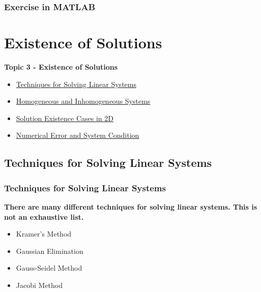 \documentclass[fleqn]{beamer} %
\newcommand{\sectionIIItitle}{Existence of Solutions}
\newcommand{\sectionIIsubsectionIVtitle}{Exercise in MATLAB}
\newcommand{\sectionIIIsubsectionItitle}{Techniques for Solving Linear Systems}
\newcommand{\sectionIIIsubsectionIItitle}{Homogeneous and Inhomogeneous Systems}
\newcommand{\sectionIIIsubsectionIIItitle}{Solution Existence Cases in 2D}
\newcommand{\sectionIIIsubsectionIVtitle}{Numerical Error and System Condition}
\begin{document}
			\begin{frame}
				\frametitle{\sectionIIsubsectionIVtitle}
				\bigskip


				\btVFill 
			\end{frame}
		
	\section{\sectionIIItitle}\label{sectionIII}

		\begin{frame}
			\large \textbf{Topic 3 - \sectionIIItitle} \vspace{3mm}\\

			\begin{itemize}
				\item \hyperlink{sectionIIIsubsectionI}{\sectionIIIsubsectionItitle} \vspc %
				\item \hyperlink{sectionIIIsubsectionII}{\sectionIIIsubsectionIItitle} \vspc %
				\item \hyperlink{sectionIIIsubsectionIII}{\sectionIIIsubsectionIIItitle} \vspc %
				\item \hyperlink{sectionIIIsubsectionIV}{\sectionIIIsubsectionIVtitle} \vspc %
			\end{itemize}

		\end{frame}

		\subsection{\sectionIIIsubsectionItitle}\label{sectionIIIsubsectionI}

			\begin{frame}
				\frametitle{\sectionIIIsubsectionItitle}
				\bigskip

				\textbf{There are many different techniques for solving linear systems. This is not an exhaustive list.} \\	
				\begin{itemize}
					\item Kramer's Method
					\item Gaussian Elimination 
					\item Gauss-Seidel Method
					\item Jacobi Method
				\end{itemize}
			  	
				\btVFill
			\end{frame}
\end{document}
